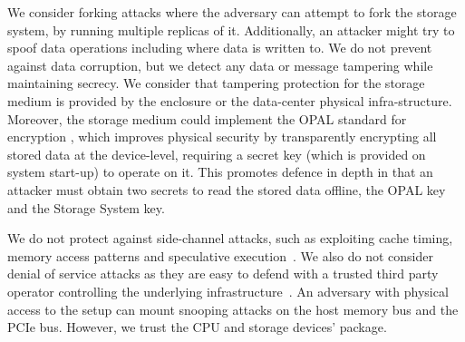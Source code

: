 
We consider forking attacks where the adversary can attempt to fork the storage system, by running multiple replicas of it. Additionally, an attacker might try to spoof data operations including where data is written to. We do not prevent against data corruption, but we detect any data or message tampering while maintaining secrecy. We consider that tampering protection for the storage medium is provided by the enclosure or the data-center physical infra-structure. Moreover, the storage medium could implement the OPAL standard for encryption \cite{opal}, which improves physical security by transparently encrypting all stored data at the device-level, requiring a secret key (which is provided on system start-up) to operate on it. This promotes defence in depth in that an attacker must obtain two secrets to read the stored data offline, the OPAL key and the Storage System key.

We do not protect against side-channel attacks, such as exploiting cache timing, memory access patterns and speculative execution~\cite{bulck-security-2018, hahnel-atc-2017, xu-ieeesp-2015}. 
We also do not consider denial of service attacks as they are easy to defend with a trusted third party operator controlling the underlying infrastructure~\cite{baumann2014}. 
An adversary with physical access to the setup can mount snooping attacks on the host memory bus and the PCIe bus. 
However, we trust the CPU and storage devices' package.%

